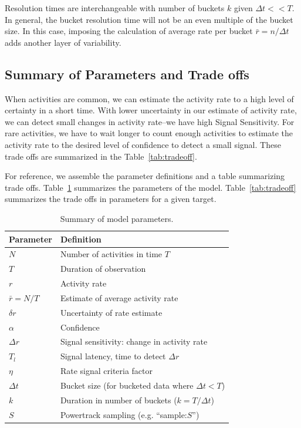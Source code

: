 \documentclass{article}
\begin{document}
Resolution times are interchangeable with number of buckets $k$ given $\Delta t << T$.  In general, the
bucket resolution time will not be an even multiple of the bucket size.  In this case, imposing the calculation
of average rate per bucket $\bar{r} = n/\Delta t$ adds another layer of variability.

\subsection{Summary of Parameters and Trade offs}

When activities are common, we can estimate the activity rate to a high level of certainty in a short time. With lower
uncertainty in our estimate of activity rate, we can detect small changes in activity rate--we have high Signal
Sensitivity. For rare activities, we have to wait longer to count enough activities to estimate the activity rate to
the desired level of confidence to detect a small signal. These trade offs are summarized in the Table~\ref{tab:tradeoff}.

For reference, we assemble the parameter definitions and a table summarizing trade offs.  Table~\ref{tab:summary}
summarizes the parameters of the model. Table~\ref{tab:tradeoff} summarizes the trade offs in parameters for
a given target.

\begin{table} [!h]
    \begin{tabular}{m{4cm}| m{7cm}}
     \hline
Parameter  & Definition \\
\hline	
$N$	& Number of activities in time $T$\\
$T$	& Duration of observation\\
$r$	& Activity rate \\
$\bar{r} = N/T$ & Estimate of average activity rate \\
$\delta r$	& Uncertainty of rate estimate \\
$\alpha$	& Confidence\\
$\Delta r$	& Signal sensitivity: change in activity rate \\
$T_l$	& Signal latency, time to detect $\Delta r$  \\
$\eta$	& Rate signal criteria factor \\
$\Delta t$	& Bucket size (for bucketed data where $\Delta t <T$) \\
$k$	& Duration in number of  buckets ($k=T/\Delta t$) \\
$S$	& Powertrack sampling (e.g. ``sample:$S$'') \\
\hline
\end{tabular}
\caption{Summary of model parameters.}
\label{tab:summary}
\end{table}
\end{document}
